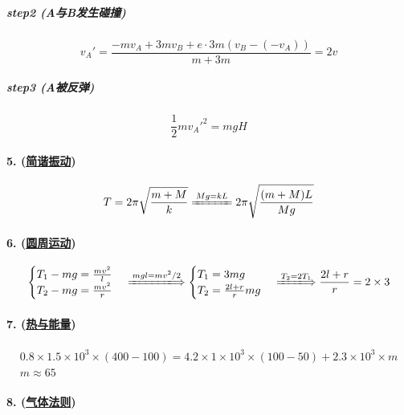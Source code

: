 \subparagraph{step2 (A与B发生碰撞)}

\begin{equation*}
    v_A'=\frac{-mv_A+3mv_B+e\cdot 3m(v_B-(-v_A))}{m+3m}=2v
\end{equation*}

\subparagraph{step3 (A被反弹)}

\begin{equation*}
    \frac12{mv_A'}^2=mgH
\end{equation*}

\paragraph{5. (\hyperref[subsec:简谐振动]{简谐振动})}

\begin{equation*}
    T=2\pi\sqrt{\frac{m+M}{k}}
    \xlongequal{Mg=kL}
    2\pi\sqrt{\frac{(m+M)L}{Mg}}
\end{equation*}

\paragraph{6. (\hyperref[subsec:圆周运动]{圆周运动})}

\begin{equation*}
    \begin{cases}
        T_1-mg=\frac{mv^2}{l}\\
        T_2-mg=\frac{mv^2}{r}
    \end{cases}\xLongrightarrow{mgl=mv^2/2}
    \begin{cases}
        T_1=3mg\\
        T_2=\frac{2l+r}{r}mg
    \end{cases}\xLongrightarrow{T_2=2T_1}
    \frac{2l+r}{r}=2\times3
\end{equation*}

\paragraph{7. (\hyperref[sec:热与能量]{热与能量})}

\begin{gather*}
    0.8\times1.5\times10^3\times(400-100)=
    4.2\times1\times10^3\times(100-50)+2.3\times10^3\times m\\
    m\approx65
\end{gather*}

\paragraph{8. (\hyperref[subsec:气体法则]{气体法则})}

